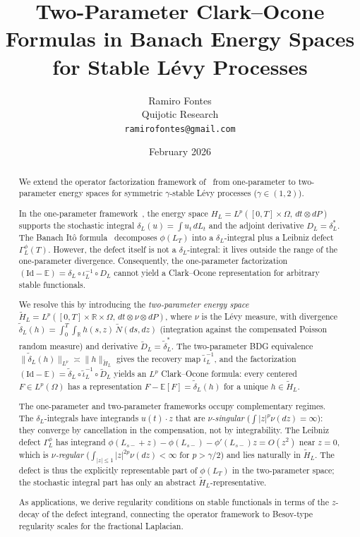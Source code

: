 \documentclass[11pt,a4paper]{article}
\title{Two-Parameter Clark--Ocone Formulas in Banach Energy Spaces\\
for Stable L\'evy Processes}
\author{Ramiro Fontes\\
Quijotic Research\\
\texttt{ramirofontes@gmail.com}}
\date{February 2026}
\theoremstyle{plain}
\theoremstyle{definition}
\theoremstyle{remark}
\newcommand{\Id}{\mathrm{Id}}
\newcommand{\E}{\mathbb{E}}
\newcommand{\R}{\mathbb{R}}
\begin{document}
\maketitle

\begin{abstract}
We extend the operator factorization framework
of~\cite{Fontes2026a,Fontes2026d} from one-parameter to
two-parameter energy spaces for symmetric $\gamma$-stable
L\'evy processes ($\gamma \in (1,2)$).

In the one-parameter framework~\cite{Fontes2026d}, the energy
space $H_L = L^p([0,T]\times\Omega,\,dt\otimes dP)$ supports
the stochastic integral $\delta_L(u) = \int u_t\,dL_t$ and
the adjoint derivative $D_L = \delta_L^*$.  The Banach It\^o
formula~\cite{Fontes2026f} decomposes $\phi(L_T)$ into a
$\delta_L$-integral plus a Leibniz defect
$\Gamma_L^{\phi}(T)$.  However, the defect itself is not a
$\delta_L$-integral: it lives outside the range of the
one-parameter divergence.  Consequently, the one-parameter
factorization $(\Id - \E) = \delta_L \circ \iota_L^{-1} \circ D_L$
cannot yield a Clark--Ocone representation for arbitrary
stable functionals.

We resolve this by introducing the \emph{two-parameter energy
space} $\widetilde{H}_L = L^p([0,T]\times\R\times\Omega,\,
dt\otimes\nu\otimes dP)$, where $\nu$ is the L\'evy measure,
with divergence
$\widetilde{\delta}_L(h) = \int_0^T\!\int_{\R}h(s,z)\,
\widetilde{N}(ds,dz)$ (integration against the compensated
Poisson random measure) and derivative
$\widetilde{D}_L = \widetilde{\delta}_L^*$.  The
two-parameter BDG equivalence
$\|\widetilde{\delta}_L(h)\|_{L^p} \asymp
\|h\|_{\widetilde{H}_L}$
gives the recovery map $\widetilde{\iota}_L^{-1}$, and the
factorization
$(\Id - \E) = \widetilde{\delta}_L \circ
\widetilde{\iota}_L^{-1} \circ \widetilde{D}_L$
yields an $L^p$ Clark--Ocone formula:
every centered $F \in L^p(\Omega)$ has a representation
$F - \E[F] = \widetilde{\delta}_L(h)$ for a unique
$h \in \widetilde{H}_L$.

The one-parameter and two-parameter frameworks occupy
complementary regimes.  The $\delta_L$-integrals have
integrands $u(t)\cdot z$ that are \emph{$\nu$-singular}
($\int|z|^p\nu(dz) = \infty$): they converge by cancellation
in the compensation, not by integrability.
The Leibniz defect $\Gamma_L^{\phi}$ has integrand
$\phi(L_{s-}+z)-\phi(L_{s-})-\phi'(L_{s-})z = O(z^2)$
near $z = 0$, which is \emph{$\nu$-regular}
($\int_{|z|\leq 1}|z|^{2p}\nu(dz) < \infty$ for
$p > \gamma/2$) and lies naturally in
$\widetilde{H}_L$.  The defect is thus the explicitly
representable part of $\phi(L_T)$ in the two-parameter space;
the stochastic integral part has only an abstract
$\widetilde{H}_L$-representative.

As applications, we derive regularity conditions on stable
functionals in terms of the $z$-decay of the defect
integrand, connecting the operator framework to Besov-type
regularity scales for the fractional Laplacian.
\end{abstract}
\end{document}

